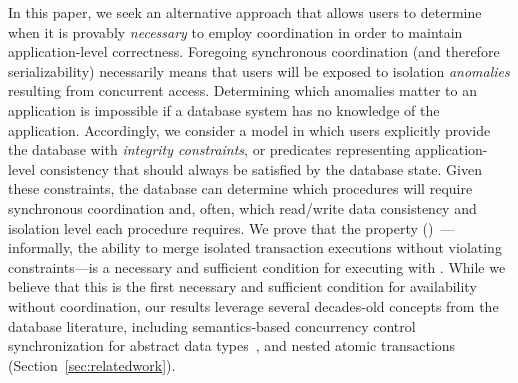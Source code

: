 In this paper, we seek an alternative approach that allows users to
determine when it is provably \textit{necessary} to employ
coordination in order to maintain application-level
correctness. Foregoing synchronous coordination (and therefore
serializability) necessarily means that users will be exposed to
isolation \textit{anomalies} resulting from concurrent
access. Determining which anomalies matter to an application is
impossible if a database system has no knowledge of the
application. Accordingly, we consider a model in which users
explicitly provide the database with \textit{integrity constraints},
or predicates representing application-level consistency that should
always be satisfied by the database state. Given these constraints,
the database can determine which procedures will require synchronous
coordination and, often, which read/write data consistency and
isolation level each procedure requires. We prove that the
\textit{\fullnameconfluence} property
(\iconfluence)~\cite{obs-confluence}---informally, the ability to
merge isolated transaction executions without violating
constraints---is a necessary and sufficient condition for executing
with \cfreedom. While we believe that this is the first necessary and
sufficient condition for availability without coordination, our
results leverage several decades-old concepts from the database
literature, including semantics-based concurrency
control~\cite{sdd1,decomp-semantics,badrinath-semantics,garciamolina-semantics,korth-serializability}
synchronization for abstract data
types~\cite{herlihy-apologizing,weihl-thesis}, and nested atomic
transactions~\cite{atomictransactions}
(Section~\ref{sec:relatedwork}).


